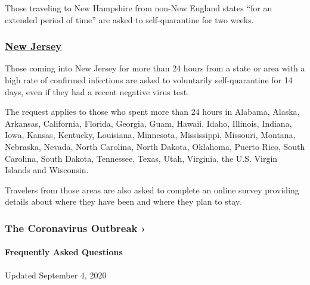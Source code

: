 Those traveling to New Hampshire from non-New England states ``for an
extended period of time'' are asked to self-quarantine for two weeks.

\hypertarget{new-jersey}{%
\subsubsection{\texorpdfstring{\href{https://covid19.nj.gov/faqs/nj-information/general-public/which-states-are-on-the-travel-advisory-list-are-there-travel-restrictions-to-or-from-new-jersey}{New
Jersey}}{New Jersey}}\label{new-jersey}}

Those coming into New Jersey for more than 24 hours from a state or area
with a high rate of confirmed infections are asked to voluntarily
self-quarantine for 14 days, even if they had a recent negative virus
test.

The request applies to those who spent more than 24 hours in Alabama,
Alaska, Arkansas, California, Florida, Georgia, Guam, Hawaii, Idaho,
Illinois, Indiana, Iowa, Kansas, Kentucky, Louisiana, Minnesota,
Mississippi, Missouri, Montana, Nebraska, Nevada, North Carolina, North
Dakota, Oklahoma, Puerto Rico, South Carolina, South Dakota, Tennessee,
Texas, Utah, Virginia, the U.S. Virgin Islands and Wisconsin.

Travelers from those areas are also asked to complete an online survey
providing details about where they have been and where they plan to
stay.

\href{https://www.nytimes3xbfgragh.onion/news-event/coronavirus?action=click\&pgtype=Article\&state=default\&region=MAIN_CONTENT_3\&context=storylines_faq}{}

\hypertarget{the-coronavirus-outbreak-}{%
\subsubsection{The Coronavirus Outbreak
›}\label{the-coronavirus-outbreak-}}

\hypertarget{frequently-asked-questions}{%
\paragraph{Frequently Asked
Questions}\label{frequently-asked-questions}}

Updated September 4, 2020


